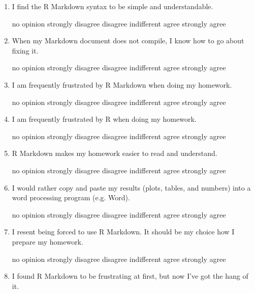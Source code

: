 \documentclass[10pt]{article}
\begin{document}
\begin{enumerate}
	\item I find the R Markdown syntax to be simple and understandable.
	\begin{center}
		no opinion \qquad strongly disagree \qquad disagree \qquad indifferent \qquad agree \qquad strongly agree
	\end{center}
	\item When my Markdown document does not compile, I know how to go about fixing it.
	\begin{center}
		no opinion \qquad strongly disagree \qquad disagree \qquad indifferent \qquad agree \qquad strongly agree
	\end{center}
	\item I am frequently frustrated by R Markdown when doing my homework.
	\begin{center}
		no opinion \qquad strongly disagree \qquad disagree \qquad indifferent \qquad agree \qquad strongly agree
	\end{center}	
	\item I am frequently frustrated by R when doing my homework.
	\begin{center}
		no opinion \qquad strongly disagree \qquad disagree \qquad indifferent \qquad agree \qquad strongly agree
	\end{center}	
	\item R Markdown makes my homework easier to read and understand.
	\begin{center}
		no opinion \qquad strongly disagree \qquad disagree \qquad indifferent \qquad agree \qquad strongly agree
	\end{center}
	\item I would rather copy and paste my results (plots, tables, and numbers) into a word processing program (e.g. Word).
	\begin{center}
		no opinion \qquad strongly disagree \qquad disagree \qquad indifferent \qquad agree \qquad strongly agree
	\end{center}
	\item I resent being forced to use R Markdown. It should be my choice how I prepare my homework.
	\begin{center}
		no opinion \qquad strongly disagree \qquad disagree \qquad indifferent \qquad agree \qquad strongly agree
	\end{center}
	\item I found R Markdown to be frustrating at first, but now I've got the hang of it.
	\begin{center}

\end{center}
\end{enumerate}
\end{document}
